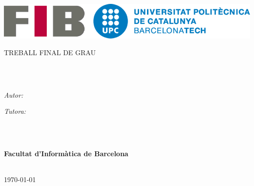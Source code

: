 \documentclass[
11pt, %
english,
spanish,
catalan,
singlespacing, %
headsepline %
]{MastersDoctoralThesis} %
\author{Pere Bergé Sànchez} %
\begin{document}
\frontmatter %

\pagestyle{plain} %


\begin{titlepage}
\begin{center}


\includegraphics[scale=0.3]{Figures/logo.png}

\vspace*{.06\textheight}
{\scshape\LARGE \univname\par}\vspace{1.5cm} %
\textsc{\Large TREBALL FINAL DE GRAU}\\[0.5cm] %

\HRule \\[0.4cm] %
{\huge \bfseries \ttitle\par}\vspace{0.4cm} %
\HRule \\[1.5cm] %
 
\begin{minipage}[t]{0.4\textwidth}
\begin{flushleft} \large
\emph{Autor:}\\
\authorname %
\end{flushleft}
\end{minipage}
\begin{minipage}[t]{0.4\textwidth}
\begin{flushright} \large
\emph{Tutora:} \\
\supname
\end{flushright}
\end{minipage}\\[3cm]
 
\vfill

\large \degreename\\[0.3cm] %
\large \textbf{Facultat d'Informàtica de Barcelona}\\ %
\deptname\\[2cm] %
 
\vfill

{\large \today}\\[4cm] %
 
\vfill
\end{center}
\end{titlepage}
\end{document}
